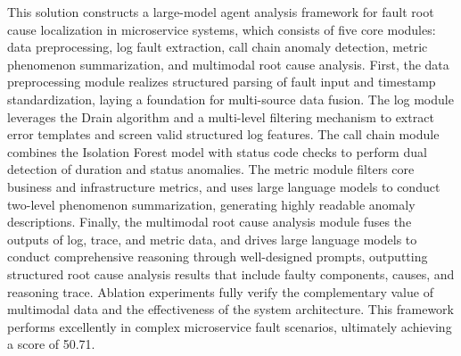 \documentclass[10pt]{article}
\begin{document}
This solution constructs a large-model agent analysis framework for fault root cause localization in microservice systems, which consists of five core modules: data preprocessing, log fault extraction, call chain anomaly detection, metric phenomenon summarization, and multimodal root cause analysis. First, the data preprocessing module realizes structured parsing of fault input and timestamp standardization, laying a foundation for multi-source data fusion. The log module leverages the Drain algorithm and a multi-level filtering mechanism to extract error templates and screen valid structured log features. The call chain module combines the Isolation Forest model with status code checks to perform dual detection of duration and status anomalies. The metric module filters core business and infrastructure metrics, and uses large language models to conduct two-level phenomenon summarization, generating highly readable anomaly descriptions. Finally, the multimodal root cause analysis module fuses the outputs of log, trace, and metric data, and drives large language models to conduct comprehensive reasoning through well-designed prompts, outputting structured root cause analysis results that include faulty components, causes, and reasoning trace. Ablation experiments fully verify the complementary value of multimodal data and the effectiveness of the system architecture. This framework performs excellently in complex microservice fault scenarios, ultimately achieving a score of 50.71.

% 

\end{document}

